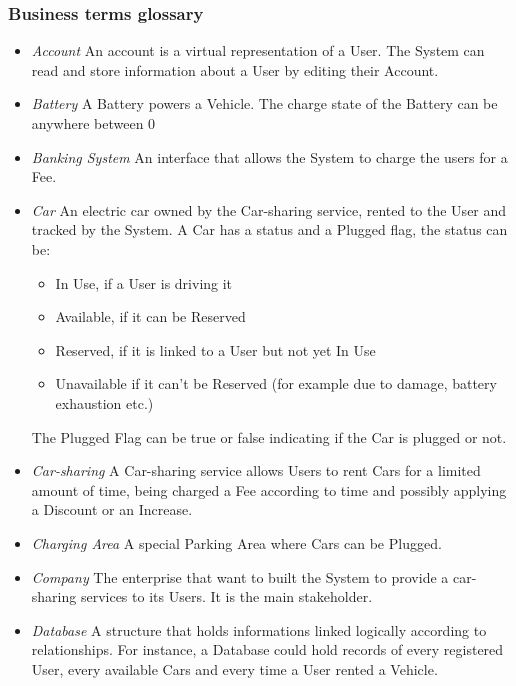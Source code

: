 \subsubsection{Business terms glossary}
\begin{itemize}
	\item \emph{Account}
	An account is a virtual representation of a User. The System can read and store information about a User by editing their Account.
	
	\item \emph{Battery}
	A Battery powers a Vehicle. The charge state of the Battery can be anywhere between 0%
	
	\item \emph{Banking System}
	An interface that allows the System to charge the users for a Fee.
	
	\item \emph{Car}
	An electric car owned by the Car-sharing service, rented to the User and tracked by the System. A Car has a status and a Plugged flag, the status can be:
	\begin{itemize}
		\item In Use, if a User is driving it
		\item Available, if it can be Reserved
		\item Reserved, if it is linked to a User but not yet In Use
		\item Unavailable if it can't be Reserved (for example due to damage, battery exhaustion etc.)
	\end{itemize}
	The Plugged Flag can be true or false indicating if the Car is plugged or not.
	
	\item \emph{Car-sharing}
	A Car-sharing service allows Users to rent Cars for a limited amount of time, being charged a Fee according to time and possibly applying a Discount or an Increase.

	\item \emph{Charging Area}
	A special Parking Area where Cars can be Plugged.

	\item \emph{Company}
	The enterprise that want to built the System to provide a car-sharing services to its Users. It is the main stakeholder.


	\item \emph{Database}
	A structure that holds informations linked logically according to relationships. For instance, a Database could hold records of every registered User, every available Cars and every time a User rented a Vehicle.


\end{itemize}
